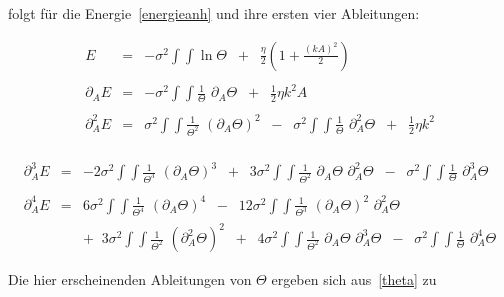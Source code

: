 \noindent folgt für die Energie~\eqref{energieanh} und ihre ersten vier Ableitungen:

\begin{small}
\begin{eqnarray*}
E &=& -\sigma^2 \int\!\!\!\int \ln \Theta\;\;+\;\;\frac{\eta}{2}\left(1+\frac{(kA)^2}{2}\right)\\
&&\\
\partial_A E &=& -\sigma^2 \int\!\!\!\int \frac{1}{\Theta}\,\, \partial_A\Theta\;\;+\;\;\frac{1}{2}\eta k^2A\\
&&\\
\partial_A^2 E &=& \sigma^2 \int\!\!\!\int \frac{1}{\Theta^2}\,\,\left(\partial_A\Theta\right)^2\;\;-\;\;\sigma^2\int\!\!\!\int\frac{1}{\Theta}\,\,\partial_A^2\Theta\;\;+\;\;\frac{1}{2}\eta k^2\\
\end{eqnarray*}
\end{small}

\begin{small}
\begin{eqnarray*}
\partial_A^3 E &=& -2\sigma^2\int\!\!\!\int\frac{1}{\Theta^3}\,\,\left(\partial_A\Theta\right)^3\;\;+\;\;3\sigma^2\int\!\!\!\int\frac{1}{\Theta^2}\,\,\partial_A\Theta\,\,\partial_A^2\Theta\;\;-\;\;\sigma^2\int\!\!\!\int\frac{1}{\Theta}\,\,\partial_A^3\Theta\\
&&\\
\partial_A^4 E &=&6\sigma^2\int\!\!\!\int\frac{1}{\Theta^4}\,\,\left(\partial_A\Theta\right)^4\;\;-\;\;12\sigma^2\int\!\!\!\int\frac{1}{\Theta^3}\,\,\left(\partial_A\Theta\right)^2\,\,\partial_A^2\Theta\\
&&+\;\;3\sigma^2\int\!\!\!\int\frac{1}{\Theta^2}\,\,\left(\partial_A^2\Theta\right)^2\;\;+\;\;4\sigma^2\int\!\!\!\int\frac{1}{\Theta^2}\,\,\partial_A\Theta\,\,\partial_A^3\Theta\;\;-\;\;\sigma^2\int\!\!\!\int\frac{1}{\Theta}\,\,\partial_A^4\Theta
\end{eqnarray*}
\end{small}

\noindent Die hier erscheinenden Ableitungen von $\Theta$ ergeben sich
aus~\eqref{theta} zu

